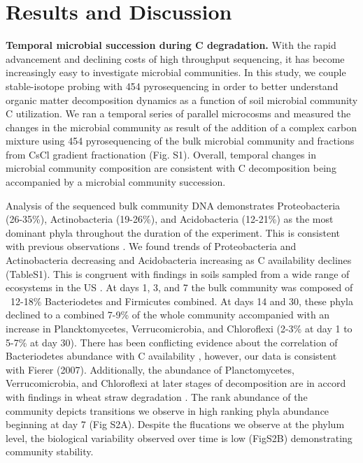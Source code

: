 \section{Results and Discussion}


\textbf{Temporal microbial succession during C degradation.} With the rapid advancement and declining costs of high throughput sequencing, it has become increasingly easy to investigate microbial communities.  In this study, we couple stable-isotope probing with 454 pyrosequencing in order to better understand organic matter decomposition dynamics as a function of soil microbial community C utilization. We ran a temporal series of parallel microcosms and measured the changes in the microbial community as result of the addition of a complex carbon mixture using 454 pyrosequencing of the bulk microbial community and fractions from CsCl gradient fractionation (Fig. S1). Overall, temporal changes in microbial community composition are consistent with C decomposition being accompanied by a microbial community succession. 

Analysis of the sequenced bulk community DNA demonstrates Proteobacteria (26-35\%), Actinobacteria (19-26\%), and Acidobacteria (12-21\%) as the most dominant phyla throughout the duration of the experiment. This is consistent with previous observations \cite{Goldfarb_2011, Fierer_2007, Rui_2009}. We found trends of Proteobacteria and Actinobacteria decreasing and Acidobacteria increasing as C availability declines (TableS1). This is congruent with findings in soils sampled from a wide range of ecosystems in the US \cite{Fierer_2007}. At days 1, 3, and 7 the bulk community was composed of ~12-18\% Bacteriodetes and Firmicutes combined.  At days 14 and 30, these phyla declined to a combined 7-9\% of the whole community accompanied with an increase in Plancktomycetes, Verrucomicrobia, and Chloroflexi (2-3\% at day 1 to 5-7\% at day 30). There has been conflicting evidence about the correlation of Bacteriodetes abundance with C availability \cite{Fierer_2007, Rui_2009, Sharp_2000}, however, our data is consistent with Fierer (2007).  Additionally, the abundance of Planctomycetes, Verrucomicrobia, and Chloroflexi at later stages of decomposition are in accord with findings in wheat straw degradation \cite{Bastian_2009}. The rank abundance of the community depicts transitions we observe in high ranking phyla abundance beginning at day 7 (Fig S2A).  Despite the flucations we observe at the phylum level, the biological variability observed over time is low (FigS2B) demonstrating community stability.   

